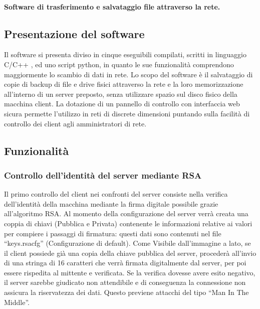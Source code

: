 \paragraph*{Software di trasferimento e salvataggio file attraverso la rete.}

\subsection*{Presentazione del software}

Il software si presenta diviso in cinque eseguibili compilati, scritti in linguaggio C/\+C++ , ed uno script python, in quanto le sue funzionalità comprendono maggiormente lo scambio di dati in rete. Lo scopo del software è il salvataggio di copie di backup di file e drive fisici attraverso la rete e la loro memorizzazione all’interno di un server preposto, senza utilizzare spazio sul disco fisico della macchina client. La dotazione di un pannello di controllo con interfaccia web sicura permette l’utilizzo in reti di discrete dimensioni puntando sulla facilità di controllo dei client agli amministratori di rete.

\subsection*{Funzionalità}

\subsubsection*{Controllo dell’identità del server mediante R\+SA}

Il primo controllo del client nei confronti del server consiste nella verifica dell’identità della macchina mediante la firma digitale possibile grazie all’algoritmo R\+SA. Al momento della configurazione del server verrà creata una coppia di chiavi (Pubblica e Privata) contenente le informazioni relative ai valori per compiere i passaggi di firmatura\+: questi dati sono contenuti nel file “keys.\+rsacfg” (Configurazione di default). Come Visibile dall’immagine a lato, se il client possiede già una copia della chiave pubblica del server, procederà all’invio di una stringa di 16 caratteri che verrà firmata digitalmente dal server, per poi essere rispedita al mittente e verificata. Se la verifica dovesse avere esito negativo, il server sarebbe giudicato non attendibile e di conseguenza la connessione non assicura la riservatezza dei dati. Questo previene attacchi del tipo “\+Man In The Middle”.

